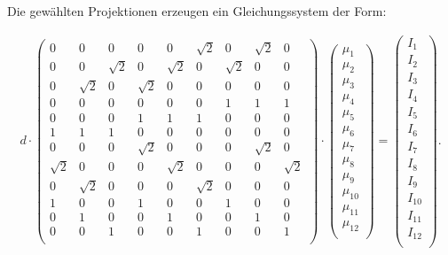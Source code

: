 Die gewählten Projektionen erzeugen ein Gleichungssystem der Form:

\begin{align}
    d \cdot
    \begin{pmatrix}
      0 & 0 & 0 & 0 & 0 & \sqrt{2} & 0 & \sqrt{2} & 0 \\
      0 & 0 & \sqrt{2} & 0 & \sqrt{2} & 0 & \sqrt{2} & 0 & 0 \\
      0 & \sqrt{2} & 0 & \sqrt{2} & 0 & 0 & 0 & 0 & 0 \\
      0 & 0 & 0 & 0 & 0 & 0 & 1 & 1 & 1 \\
      0 & 0 & 0 & 1 & 1 & 1 & 0 & 0 & 0 \\
      1 & 1 & 1 & 0 & 0 & 0 & 0 & 0 & 0 \\
      0 & 0 & 0 & \sqrt{2} & 0 & 0 & 0  & \sqrt{2} & 0 \\
      \sqrt{2} & 0 & 0 & 0 & \sqrt{2} & 0 & 0 & 0 & \sqrt{2} \\
      0 & \sqrt{2} & 0 & 0 & 0  & \sqrt{2} & 0 & 0 & 0\\
      1 & 0 & 0 & 1 & 0 & 0 & 1 & 0 & 0 \\
      0 & 1 & 0 & 0 & 1 & 0 & 0 & 1 & 0 \\
      0 & 0 & 1 & 0 & 0 & 1 & 0 & 0 & 1 \\
    \end{pmatrix}
    \cdot
    \begin{pmatrix}
      \mu_1 \\
      \mu_2 \\
      \mu_3 \\
      \mu_4 \\
      \mu_5 \\
      \mu_6 \\
      \mu_7 \\
      \mu_8 \\
      \mu_9 \\
      \mu_{10} \\
      \mu_{11} \\
      \mu_{12} \\
    \end{pmatrix}
    =
    \begin{pmatrix}
      I_1 \\
      I_2 \\
      I_3 \\
      I_4 \\
      I_5 \\
      I_6 \\
      I_7 \\
      I_8 \\
      I_9 \\
      I_{10} \\
      I_{11} \\
      I_{12} \\
    \end{pmatrix}.
    \label{eqn:LGS_ausgeschrieben}
\end{align}

